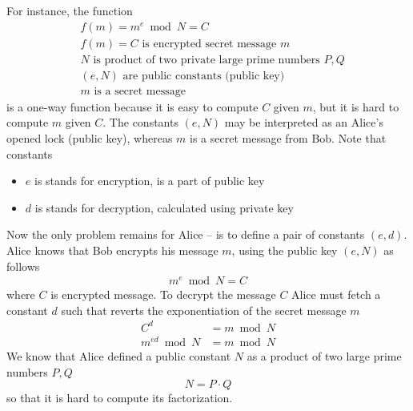 ﻿For instance, the function
\begin{align*}
    &f(m) = m^e \bmod N = C \\
    &f(m) = C \text{ is encrypted secret message } m \\
    &N \text{ is product of two private large prime numbers } P,Q \\
    &(e, N) \text{ are public constants (public key)} \\
    &m \text{ is a secret message}
\end{align*}
is a one-way function because it is easy to compute $C$ given $m$, but it is hard to compute $m$ given $C$.
The constants $(e, N)$ may be interpreted as an Alice's opened lock (public key),
whereas $m$ is a secret message from Bob.
Note that constants
\begin{itemize}
    \item $e$ is stands for encryption, is a part of public key
    \item $d$ is stands for decryption, calculated using private key
\end{itemize}
Now the only problem remains for Alice -- is to define a pair of constants $(e, d)$.
Alice knows that Bob encrypts his message $m$, using the public key $(e, N)$ as follows
\begin{align*}
    m^e \bmod N = C
\end{align*}
where $C$ is encrypted message.
To decrypt the message $C$ Alice must fetch a constant $d$ such that reverts the exponentiation of the
secret message $m$
\begin{align*}
    C^d            &= m \bmod N \\
    m^{ed} \bmod N &= m \bmod N
\end{align*}
We know that Alice defined a public constant $N$ as a product of two large prime numbers $P, Q$
\[
    N = P \cdot Q
\]
so that it is hard to compute its factorization.

